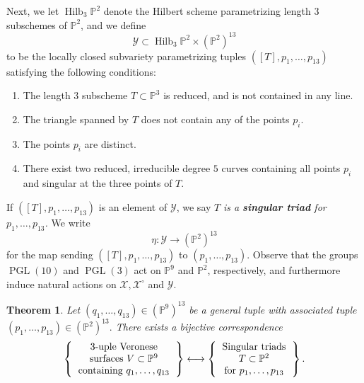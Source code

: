 \documentclass[reqno, 11pt]{amsart}
\theoremstyle{plain}
\newtheorem{theorem}{Theorem}[section]
\theoremstyle{remark}
\renewcommand{\P}{\mathbb{P}}
\DeclareMathOperator{\PGL}{PGL}
\DeclareMathOperator{\Hilb}{Hilb}
\begin{document}
Next, we let $\Hilb_{3}\P^{2}$ denote the Hilbert scheme parametrizing length $3$ subschemes of $\P^{2}$, and we define  $$\mathcal{Y} \subset \Hilb_{3}\P^{2} \times (\P^{2})^{13}$$ to be the locally closed subvariety parametrizing tuples $\left([T], p_1, \dots, p_{13}\right)$ satisfying the following conditions: 

\begin{enumerate}
    \item The length $3$ subscheme $T \subset \P^{3}$ is reduced, and is not contained in any line.
    \item The triangle spanned by $T$ does not contain any of the points $p_{i}$.
    \item The points $p_{i}$ are distinct.
    \item There exist two reduced, irreducible degree $5$ curves containing all points $p_{i}$ and singular at the three points of $T$.
\end{enumerate}

If $\left([T], p_{1}, \dots, p_{13} \right)$ is an element of $\mathcal{Y}$, we say $T$ \emph{is a {\bf singular triad} for $p_{1}, \dots, p_{13}$.}
We write $$\eta: \mathcal{Y} \to (\P^{2})^{13}$$ for the map sending $([T],p_{1}, \dots, p_{13})$ to $(p_{1}, \dots, p_{13})$.  Observe that the groups $\PGL(10)$ and $\PGL(3)$ act on $\P^{9}$ and $\P^{2}$, respectively, and furthermore induce natural actions on $\mathcal{X}, \mathcal{X}^{\circ}$ and $\mathcal{Y}$. 

\begin{theorem}
\label{theorem:translation}
Let $(q_{1}, \dots, q_{13}) \in (\P^{9})^{13}$ be a general tuple with associated tuple $(p_{1}, \dots, p_{13}) \in (\P^{2})^{13}.$  There exists a bijective correspondence 
\begin{align*}
    \left\{ \begin{tabular}{c}
         $3$-uple Veronese\\ surfaces $V \subset \P^{9}$ \\
         containing $q_{1}, \dots , q_{13}$
    \end{tabular}\right\} \longleftrightarrow \left\{ \begin{tabular}{c}
         Singular triads \\ $T \subset \P^{2}$ \\
         for $p_{1}, \dots, p_{13}$
    \end{tabular} \right\}.
\end{align*}
\end{theorem}
\end{document}
